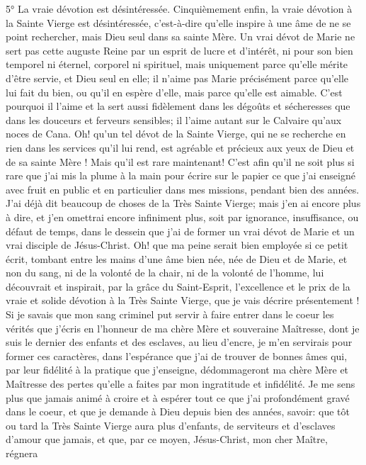 5° La vraie dévotion est désintéressée.
 Cinquièmement enfin, la vraie dévotion à la Sainte Vierge est désintéressée, c'est-à-dire qu'elle inspire à une
âme de ne se point rechercher, mais Dieu seul dans sa sainte Mère. Un vrai dévot de Marie ne sert pas cette
auguste Reine par un esprit de lucre et d'intérêt, ni pour son bien temporel ni éternel, corporel ni spirituel, mais
uniquement parce qu'elle mérite d'être servie, et Dieu seul en elle; il n'aime pas Marie précisément parce qu'elle lui
fait du bien, ou qu'il en espère d'elle, mais parce qu'elle est aimable. C'est pourquoi il l'aime et la sert aussi
fidèlement dans les dégoûts et sécheresses que dans les douceurs et ferveurs sensibles; il l'aime autant sur le
Calvaire qu'aux noces de Cana. Oh! qu'un tel dévot de la Sainte Vierge, qui ne se recherche en rien dans les
services qu'il lui rend, est agréable et précieux aux yeux de Dieu et de sa sainte Mère ! Mais qu'il est rare
maintenant! C'est afin qu'il ne soit plus si rare que j'ai mis la plume à la main pour écrire sur le papier ce que j'ai
enseigné avec fruit en public et en particulier dans mes missions, pendant bien des années.
 J'ai déjà dit beaucoup de choses de la Très Sainte Vierge; mais j'en ai encore plus à dire, et j'en omettrai
encore infiniment plus, soit par ignorance, insuffisance, ou défaut de temps, dans le dessein que j'ai de former un
vrai dévot de Marie et un vrai disciple de Jésus-Christ.
 Oh! que ma peine serait bien employée si ce petit écrit, tombant entre les mains d'une âme bien née, née de
Dieu et de Marie, et non du sang, ni de la volonté de la chair, ni de la volonté de l'homme, lui découvrait et
inspirait, par la grâce du Saint-Esprit, l'excellence et le prix de la vraie et solide dévotion à la Très Sainte Vierge,
que je vais décrire présentement ! Si je savais que mon sang criminel put servir à faire entrer dans le coeur les
vérités que j'écris en l'honneur
de ma chère Mère et souveraine Maîtresse, dont je suis le dernier des enfants et des esclaves, au lieu d'encre, je
m'en servirais pour former ces caractères, dans l'espérance que j'ai de trouver de bonnes âmes qui, par leur
fidélité à la pratique que j'enseigne, dédommageront ma chère Mère et Maîtresse des pertes qu'elle a faites par
mon ingratitude et infidélité.
 Je me sens plus que jamais animé à croire et à espérer tout ce que j'ai profondément gravé dans le coeur, et
que je demande à Dieu depuis bien des années, savoir: que tôt ou tard la Très Sainte Vierge aura plus d'enfants,
de serviteurs et d'esclaves d'amour que jamais, et que, par ce moyen, Jésus-Christ, mon cher Maître, régnera
